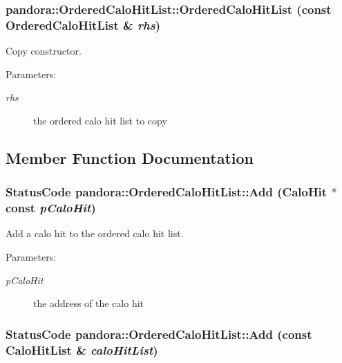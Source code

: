 \subsubsection{\setlength{\rightskip}{0pt plus 5cm}pandora::Ordered\-Calo\-Hit\-List::Ordered\-Calo\-Hit\-List (const \bf{Ordered\-Calo\-Hit\-List} \& {\em rhs})}\label{classpandora_1_1OrderedCaloHitList_6c57146f03473d6afb6e341ba95719b3}


Copy constructor. 

\begin{Desc}
\item[Parameters:]
\begin{description}
\item[{\em rhs}]the ordered calo hit list to copy \end{description}
\end{Desc}


\subsection{Member Function Documentation}
\subsubsection{\setlength{\rightskip}{0pt plus 5cm}Status\-Code pandora::Ordered\-Calo\-Hit\-List::Add (\bf{Calo\-Hit} $\ast$const  {\em p\-Calo\-Hit})\hspace{0.3cm}{\tt  [inline]}}\label{classpandora_1_1OrderedCaloHitList_96aa19513de100cef4b1fa7fe095b578}


Add a calo hit to the ordered calo hit list. 

\begin{Desc}
\item[Parameters:]
\begin{description}
\item[{\em p\-Calo\-Hit}]the address of the calo hit \end{description}
\end{Desc}
\subsubsection{\setlength{\rightskip}{0pt plus 5cm}Status\-Code pandora::Ordered\-Calo\-Hit\-List::Add (const Calo\-Hit\-List \& {\em calo\-Hit\-List})}\label{classpandora_1_1OrderedCaloHitList_fd3a5699438bfab61aad1e6bfef0eaf4}


